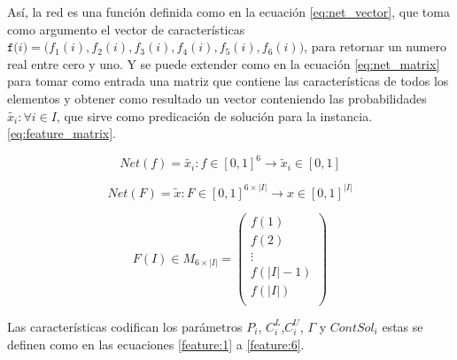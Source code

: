 \documentclass[spanish, a4paper, 12pt, openany,final]{book}
\begin{document}
Así, la red es una función definida como en la ecuación \eqref{eq:net_vector}, que toma como argumento el vector de características $\texttt{f($i$)} = \textbf{(}f_1(i),f_2(i),f_3(i),f_4(i),f_5(i),f_6(i)\textbf{)}$, para retornar un numero real entre cero y uno. Y se puede extender como en la ecuación \eqref{eq:net_matrix} para tomar como entrada una matriz que contiene las características de todos los elementos y obtener como resultado un vector conteniendo las probabilidades $\tilde{x_i} :\forall i \in I$, que sirve como predicación de solución para la instancia. \eqref{eq:feature_matrix}.

\begin{equation}
	\label{eq:net_vector}
	Net(f) = \tilde{x_i}: f\in [0,1]^6 \rightarrow \tilde{x}_i \in[0,1]
\end{equation}

\begin{equation}
	\label{eq:net_matrix}
	Net(F) = \tilde{x}: F\in [0,1]^{6\times |I|} \rightarrow x \in[0,1]^{|I|}
\end{equation}

\begin{equation}
	F(I) \in M_{6 \times |I|} = 
	\left( 
	\begin{matrix}
		f(1)\\
		f(2)\\
		\vdots \\
		f(|I|-1)\\
		f(|I|)\\
	\end{matrix}
	\right)
	\label{eq:feature_matrix}
\end{equation}

Las características codifican los parámetros $P_i$, $C^L_i$,$C^U_i$, $\Gamma$ y $ContSol_i$ estas se definen como en las ecuaciones \eqref{feature:1} a \eqref{feature:6}.
\end{document}
